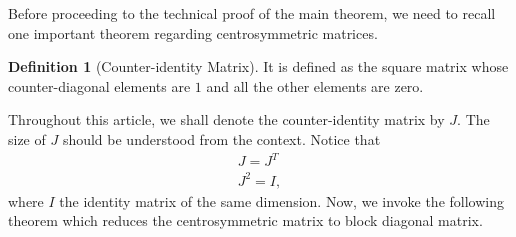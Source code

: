 \documentclass[12pt]{amsart}
\theoremstyle{plain}
\theoremstyle{definition}
\newtheorem{defn}[Thm]{Definition}
\begin{document}
Before proceeding to the technical proof of the main theorem, we need to recall one important theorem regarding centrosymmetric matrices.

\begin{defn}[Counter-identity Matrix]\label{dfn: counter-identity} It is defined as the square matrix whose counter-diagonal elements are $1$ and all the other elements are zero.
\end{defn}

Throughout this article, we shall denote the counter-identity matrix by $J$. The size of $J$ should be understood from the context. Notice that 
\begin{align*}
J=J^{T}\\
J^{2}= I,
\end{align*}
where $I$ the identity matrix of the same dimension. Now, we invoke the following theorem which reduces the centrosymmetric matrix to block diagonal matrix.
\end{document}
